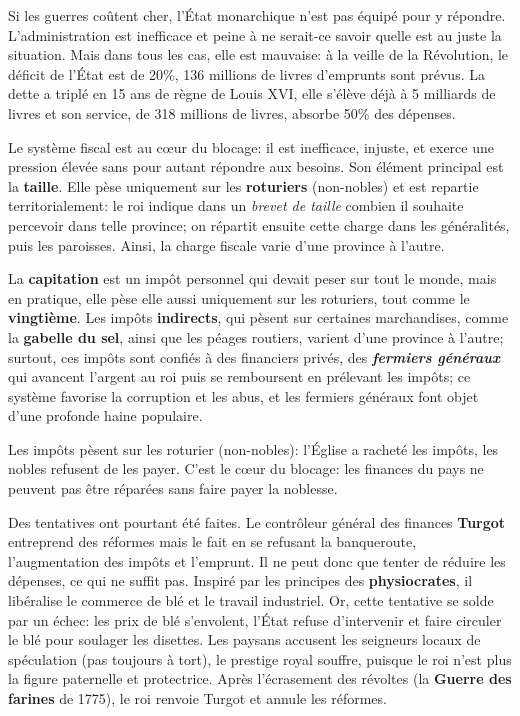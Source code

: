 \documentclass[
  french,
  letterpaper,
  DIV=11,
  numbers=noendperiod]{scrartcl}
\begin{document}
Si les guerres coûtent cher, l'État monarchique n'est pas équipé pour y
répondre. L'administration est inefficace et peine à ne serait-ce savoir
quelle est au juste la situation. Mais dans tous les cas, elle est
mauvaise: à la veille de la Révolution, le déficit de l'État est de
20\%, 136 millions de livres d'emprunts sont prévus. La dette a triplé
en 15 ans de règne de Louis XVI, elle s'élève déjà à 5 milliards de
livres et son service, de 318 millions de livres, absorbe 50\% des
dépenses.

Le système fiscal est au cœur du blocage: il est inefficace, injuste, et
exerce une pression élevée sans pour autant répondre aux besoins. Son
élément principal est la \textbf{taille}. Elle pèse uniquement sur les
\textbf{roturiers} (non-nobles) et est repartie territorialement: le roi
indique dans un \emph{brevet de taille} combien il souhaite percevoir
dans telle province; on répartit ensuite cette charge dans les
généralités, puis les paroisses. Ainsi, la charge fiscale varie d'une
province à l'autre.

La \textbf{capitation} est un impôt personnel qui devait peser sur tout
le monde, mais en pratique, elle pèse elle aussi uniquement sur les
roturiers, tout comme le \textbf{vingtième}. Les impôts
\textbf{indirects}, qui pèsent sur certaines marchandises, comme la
\textbf{gabelle du sel}, ainsi que les péages routiers, varient d'une
province à l'autre; surtout, ces impôts sont confiés à des financiers
privés, des \textbf{\emph{fermiers généraux}} qui avancent l'argent au
roi puis se remboursent en prélevant les impôts; ce système favorise la
corruption et les abus, et les fermiers généraux font objet d'une
profonde haine populaire.

Les impôts pèsent sur les roturier (non-nobles): l'Église a racheté les
impôts, les nobles refusent de les payer. C'est le cœur du blocage: les
finances du pays ne peuvent pas être réparées sans faire payer la
noblesse.

Des tentatives ont pourtant été faites. Le contrôleur général des
finances \textbf{Turgot} entreprend des réformes mais le fait en se
refusant la banqueroute, l'augmentation des impôts et l'emprunt. Il ne
peut donc que tenter de réduire les dépenses, ce qui ne suffit pas.
Inspiré par les principes des \textbf{physiocrates}, il libéralise le
commerce de blé et le travail industriel. Or, cette tentative se solde
par un échec: les prix de blé s'envolent, l'État refuse d'intervenir et
faire circuler le blé pour soulager les disettes. Les paysans accusent
les seigneurs locaux de spéculation (pas toujours à tort), le prestige
royal souffre, puisque le roi n'est plus la figure paternelle et
protectrice. Après l'écrasement des révoltes (la \textbf{Guerre des
farines} de 1775), le roi renvoie Turgot et annule les réformes.
\end{document}
